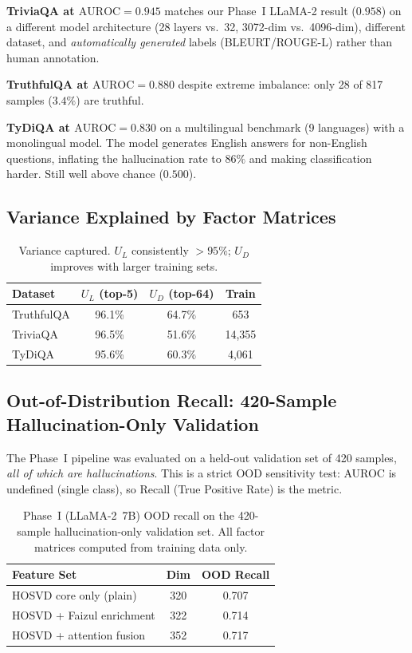 \documentclass[11pt,a4paper]{article}
\begin{document}
\noindent
\textbf{TriviaQA at $\text{AUROC}=0.945$} matches our Phase~I LLaMA-2 result
($0.958$) on a different model architecture (28 layers vs.\ 32, 3072-dim vs.\
4096-dim), different dataset, and \emph{automatically generated} labels
(BLEURT/ROUGE-L) rather than human annotation.

\noindent
\textbf{TruthfulQA at $\text{AUROC}=0.880$} despite extreme imbalance: only
28 of 817 samples ($3.4\%$) are truthful.

\noindent
\textbf{TyDiQA at $\text{AUROC}=0.830$} on a multilingual benchmark (9
languages) with a monolingual model.  The model generates English answers for
non-English questions, inflating the hallucination rate to $86\%$ and making
classification harder.  Still well above chance ($0.500$).

\subsection{Variance Explained by Factor Matrices}

\begin{table}[h]
\centering
\begin{tabular}{lccc}
\toprule
\textbf{Dataset} & \textbf{$U_L$ (top-5)} & \textbf{$U_D$ (top-64)} & \textbf{Train} \\
\midrule
TruthfulQA  & 96.1\% & 64.7\% & 653 \\
TriviaQA    & 96.5\% & 51.6\% & 14,355 \\
TyDiQA      & 95.6\% & 60.3\% & 4,061 \\
\bottomrule
\end{tabular}
\caption{Variance captured.  $U_L$ consistently $>95\%$; $U_D$ improves with
         larger training sets.}
\end{table}

\subsection{Out-of-Distribution Recall: 420-Sample Hallucination-Only Validation}
\label{sec:validation}

The Phase~I pipeline was evaluated on a held-out validation set of 420
samples, \emph{all of which are hallucinations}.  This is a strict OOD
sensitivity test: AUROC is undefined (single class), so Recall (True
Positive Rate) is the metric.

\begin{table}[h]
\centering
\begin{tabular}{lcc}
\toprule
\textbf{Feature Set} & \textbf{Dim} & \textbf{OOD Recall} \\
\midrule
HOSVD core only (plain)         & 320 & 0.707 \\
HOSVD + Faizul enrichment       & 322 & 0.714 \\
HOSVD + attention fusion        & 352 & 0.717 \\
\bottomrule
\end{tabular}
\caption{Phase~I (LLaMA-2~7B) OOD recall on the 420-sample hallucination-only
         validation set.  All factor matrices computed from training data only.}
\end{table}
\end{document}
